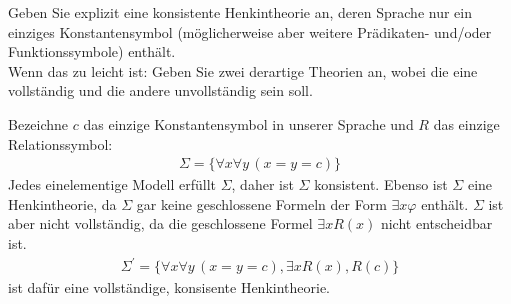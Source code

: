 
\begin{exercise}[138]

Geben Sie explizit eine konsistente Henkintheorie an, deren Sprache nur ein
einziges Konstantensymbol (möglicherweise aber weitere Prädikaten- und/oder
Funktionssymbole) enthält. \\
Wenn das zu leicht ist: Geben Sie zwei derartige Theorien an, wobei die eine
vollständig und die andere unvollständig sein soll.

\end{exercise}


\begin{solution}
Bezeichne $c$ das einzige Konstantensymbol in unserer Sprache und $R$ das
einzige Relationssymbol:
\begin{align*}
  \Sigma = \{\forall x \forall y\, (x = y = c)\}
\end{align*}
Jedes einelementige Modell erfüllt $\Sigma$, daher ist $\Sigma$ konsistent.
Ebenso ist $\Sigma$ eine Henkintheorie, da $\Sigma$ gar keine geschlossene
Formeln der Form $\exists x \varphi$ enthält. $\Sigma$ ist aber nicht vollständig,
da die geschlossene Formel $\exists x R(x)$ nicht entscheidbar ist.
\begin{align*}
  \Sigma^{\prime} = \{\forall x \forall y\, (x = y = c), \exists x R(x), R(c)\}
\end{align*}
ist dafür eine vollständige, konsisente Henkintheorie.
\end{solution}

